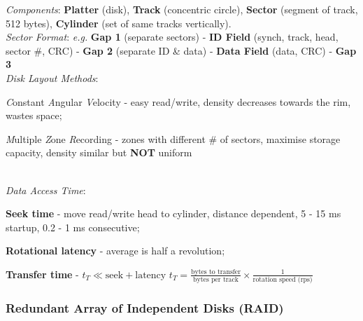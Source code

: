 \emph{Components}: \textbf{Platter} (disk), \textbf{Track} (concentric circle), \textbf{Sector} (segment of track, 512 bytes), \textbf{Cylinder} (set of same tracks vertically).\\
\emph{Sector Format}: {\footnotesize\itshape e.g.}
\textbf{Gap 1} (separate sectors) -
\textbf{ID Field} (synch, track, head, sector \#, CRC) -
\textbf{Gap 2} (separate ID \& data) -
\textbf{Data Field} (data, CRC) -
\textbf{Gap 3}\\
\emph{Disk Layout Methods}: \begin{enuminline}
\item \emph{C}onstant \emph{A}ngular \emph{V}elocity -
easy read/write, density decreases towards the rim, wastes space;
\item \emph{M}ultiple \emph{Z}one \emph{R}ecording -
zones with different \# of sectors, maximise storage capacity, density similar but \textbf{NOT} uniform
\end{enuminline}\\
\emph{Data Access Time}: \begin{enuminline}
\item \textbf{Seek time} - move read/write head to cylinder, distance dependent, 5 - 15 ms startup, 0.2 - 1 ms consecutive;
\item \textbf{Rotational latency} - average is half a revolution;
\item \textbf{Transfer time} - $t_T\ll \text{seek}+\text{latency}$
$t_T = \frac{\text{bytes to transfer}}{\text{bytes per track}} \times \frac{1}{\text{rotation speed (rps)}}$
\end{enuminline}

\subsubsection*{Redundant Array of Independent Disks (RAID)}

